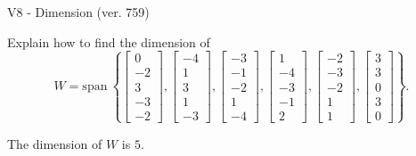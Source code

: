 \begin{exercise}
  \begin{exerciseTitle}V8 - Dimension (ver. 759)\end{exerciseTitle}
  \begin{exerciseStatement}
    Explain how to find the dimension of 
\[W=\mathrm{span}\ \left\{\left[\begin{array}{r}
0 \\
-2 \\
3 \\
-3 \\
-2
\end{array}\right] , \left[\begin{array}{r}
-4 \\
1 \\
3 \\
1 \\
-3
\end{array}\right] , \left[\begin{array}{r}
-3 \\
-1 \\
-2 \\
1 \\
-4
\end{array}\right] , \left[\begin{array}{r}
1 \\
-4 \\
-3 \\
-1 \\
2
\end{array}\right] , \left[\begin{array}{r}
-2 \\
-3 \\
-2 \\
1 \\
1
\end{array}\right] , \left[\begin{array}{r}
3 \\
3 \\
0 \\
3 \\
0
\end{array}\right]\right\}.\]



  \end{exerciseStatement}
  \begin{exerciseAnswer}
   The dimension of \(W\) is  \(5\).
  


  \end{exerciseAnswer}
\end{exercise}